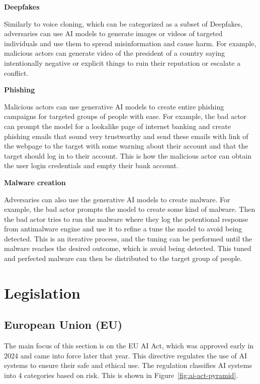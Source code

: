 \textbf{Deepfakes}

Similarly to voice cloning, which can be categorized as a subset of Deepfakes, adversaries can use AI models to generate images or videos of targeted individuals and use them to spread misinformation and cause harm. For example, malicious actors can generate video of the president of a country saying intentionally negative or explicit things to ruin their reputation or escalate a conflict.

\textbf{Phishing}

Malicious actors can use generative AI models to create entire phishing campaigns for targeted groups of people with ease. For example, the bad actor can prompt the model for a lookalike page of internet banking and create phishing emails that sound very trustworthy and send these emails with link of the webpage to the target with some warning about their account and that the target should log in to their account. This is how the malicious actor can obtain the user login credentials and empty their bank account.

\textbf{Malware creation}

Adversaries can also use the generative AI models to create malware. For example, the bad actor prompts the model to create some kind of malware. Then the bad actor tries to run the malware where they log the potentional response from antimalware engine and use it to refine a tune the model to avoid being detected. This is an iterative process, and the tuning can be performed until the malware reaches the desired outcome, which is avoid being detected. This tuned and perfected malware can then be distributed to the target group of people.


\section{Legislation} \label{sec:legislation}

\subsection{European Union (EU)}
The main focus of this section is on the EU AI Act\cite{eu_ai_act_2024}, which was approved early in 2024 and came into force later that year. This directive regulates the use of AI systems to ensure their safe and ethical use. The regulation classifies AI systems into 4 categories based on risk. This is shown in Figure~\ref{fig:ai-act-pyramid}.

